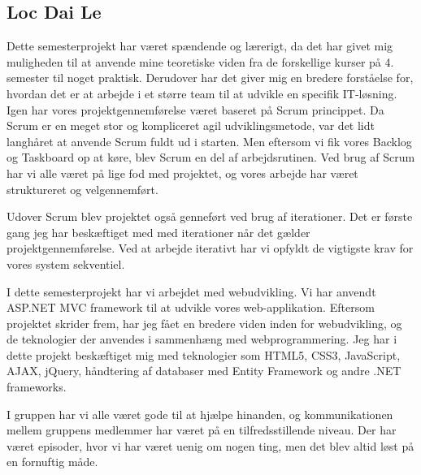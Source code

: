 \subsection*{Loc Dai Le}

Dette semesterprojekt har været spændende og lærerigt, da det har givet mig muligheden til at anvende mine teoretiske viden fra de forskellige kurser på 4. semester til noget praktisk. Derudover har det giver mig en bredere forståelse for, hvordan det er at arbejde i et større team til at udvikle en specifik IT-løsning. 
Igen har vores projektgennemførelse været baseret på Scrum princippet. Da Scrum er en meget stor og kompliceret agil udviklingsmetode, var det lidt langhåret at anvende Scrum fuldt ud i starten. Men eftersom vi fik vores Backlog og Taskboard op at køre, blev Scrum en del af arbejdsrutinen.   
Ved brug af Scrum har vi alle været på lige fod med projektet, og vores arbejde har været struktureret og velgennemført.

Udover Scrum blev projektet også genneført ved brug af iterationer. Det er første gang jeg har beskæftiget med med iterationer når det gælder projektgennemførelse. Ved at arbejde iterativt har vi opfyldt de vigtigste krav for vores system sekventiel. 

I dette semesterprojekt har vi arbejdet med webudvikling. Vi har anvendt ASP.NET MVC framework til at udvikle vores web-applikation. Eftersom projektet skrider frem, har jeg fået en bredere viden inden for webudvikling, og de teknologier der anvendes i sammenhæng med webprogrammering. Jeg har i dette projekt beskæftiget mig med teknologier som HTML5, CSS3, JavaScript, AJAX, jQuery, håndtering af databaser med Entity Framework og andre .NET frameworks. 


I gruppen har vi alle været gode til at hjælpe hinanden, og kommunikationen mellem gruppens medlemmer har været på en tilfredsstillende niveau. Der har været episoder, hvor vi har været uenig om nogen ting, men det blev altid løst på en fornuftig måde. 
